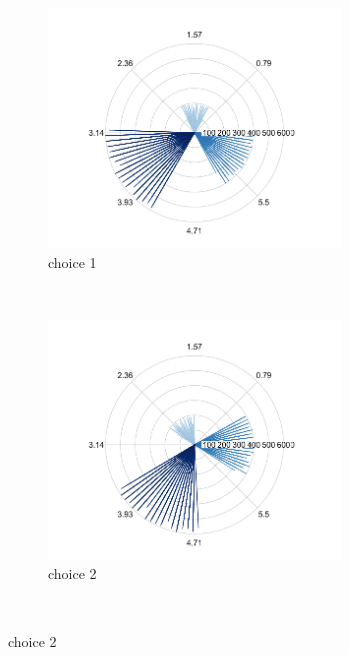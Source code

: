 \documentclass[11pt]{article}
\begin{document}
 \begin{figure}[ht]
    \centering    
     \begin{subfigure}[t]{0.5\textwidth}
        \centering
        \includegraphics[height=2.5in]{../figures/cell_order_R_figs/et_cell_order_sim3_choice1.png}
        \caption{choice 1}
    \end{subfigure}%
    ~
    \begin{subfigure}[t]{0.5\textwidth}
        \centering
        \includegraphics[height=2.5in]{../figures/cell_order_R_figs/et_cell_order_sim3_choice2.png}
        \caption{choice 2}
    \end{subfigure}\\
    

\end{figure}
\end{document}

